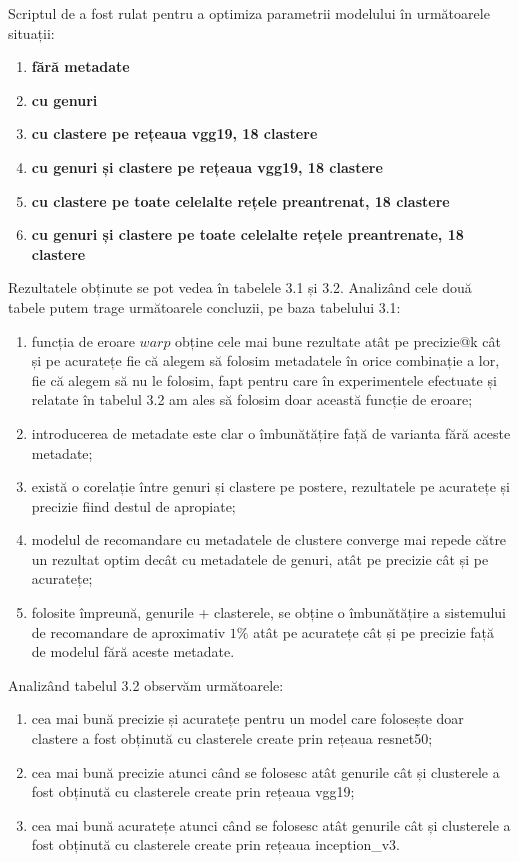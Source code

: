 Scriptul de a fost rulat pentru a optimiza parametrii modelului în următoarele situații:
\begin{enumerate}
	\item \textbf{fără metadate}
	\item \textbf{cu genuri}
	\item \textbf{cu clastere pe rețeaua vgg19, 18 clastere}
	\item \textbf{cu genuri și clastere pe rețeaua vgg19, 18 clastere}
	\item \textbf{cu clastere pe toate celelalte rețele preantrenat, 18 clastere}
	\item \textbf{cu genuri și clastere pe toate celelalte rețele preantrenate, 18 clastere}
\end{enumerate}
Rezultatele obținute se pot vedea în tabelele 3.1 și 3.2. Analizând cele două tabele putem trage următoarele concluzii, pe baza tabelului 3.1:
\begin{enumerate}
	\item funcția de eroare $warp$ obține cele mai bune rezultate atât pe precizie@k cât și pe acuratețe fie că alegem să folosim metadatele în orice combinație a lor, fie că alegem să nu le folosim, fapt pentru care în experimentele efectuate și relatate în tabelul 3.2 am ales să folosim doar această funcție de eroare;
	\item introducerea de metadate este clar o îmbunătățire față de varianta fără aceste metadate;
	\item există o corelație între genuri și clastere pe postere, rezultatele pe acuratețe și precizie fiind destul de apropiate;
	\item modelul de recomandare cu metadatele de clustere converge mai repede către un rezultat optim decât cu metadatele de genuri, atât pe precizie cât și pe acuratețe;
	\item folosite împreună, genurile + clasterele, se obține o îmbunătățire a sistemului de recomandare de aproximativ $1\%$ atât pe acuratețe cât și pe precizie față de modelul fără aceste metadate.
\end{enumerate}

Analizând tabelul 3.2 observăm următoarele:
\begin{enumerate}
	\item cea mai bună precizie și acuratețe pentru un model care folosește doar clastere a fost obținută cu clasterele create prin rețeaua resnet50;
	\item cea mai bună precizie atunci când se folosesc atât genurile cât și clusterele a fost obținută cu clasterele create prin rețeaua vgg19;
	\item cea mai bună acuratețe atunci când se folosesc atât genurile cât și clusterele a fost obținută cu clasterele create prin rețeaua inception\_v3.
\end{enumerate}

